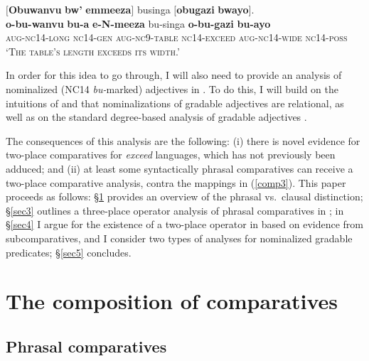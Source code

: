 \documentclass[output=paper,
modfonts
]{langscibook}
\begin{document}
\begin{exe}
\ex\label{length1aa}
 \glll $[$\textbf{Obuwanvu} \textbf{bw'} \textbf{emmeeza}$]$ businga  $[$\textbf{obugazi} \textbf{bwayo}$]$.\\
\textbf{o-bu-wanvu} \textbf{bu-a} \textbf{e-N-meeza} bu-singa \textbf{o-bu-gazi} \textbf{bu-ayo} \\
\scshape aug-nc14\rm-long \scshape nc14-gen \scshape aug-nc9\rm-table \scshape nc14\rm-exceed \scshape aug-nc14\rm-wide \scshape nc14-poss \\
\glt `The table's length exceeds its width.'   %
\end{exe}


\noindent In order for this idea to go through, I will also need to provide an analysis of nominalized (NC14 {\it bu-}marked)  adjectives in . To do this, I will build on the intuitions of \citet{moltmann09degree} and \citet{nicolas04semantics} that nominalizations of gradable adjectives are relational, as well as on the standard degree-based analysis of gradable adjectives \citep[among others]{cresswell76semantics, kennedy05scale, vonstechow84comparing}.
 
 \largerpage
The consequences of this analysis are the following: (i) there is novel evidence for two-place comparatives for {\it exceed} languages, which has not previously been adduced; and (ii) at least some syntactically phrasal comparatives can receive a two-place comparative analysis, contra the mappings in (\ref{comp3}). This paper proceeds as follows: \S\ref{sec2} provides an overview of the phrasal vs.~clausal distinction; \S\ref{sec3} outlines a three-place operator analysis of phrasal comparatives in ; in \S\ref{sec4} I argue for the existence of a two-place operator in  based on evidence from subcomparatives, and I consider two types of analyses for nominalized gradable predicates; \S\ref{sec5} concludes. 







\section{The composition of comparatives}\label{sec2}
 \largerpage


\subsection{Phrasal comparatives}
\end{document}

